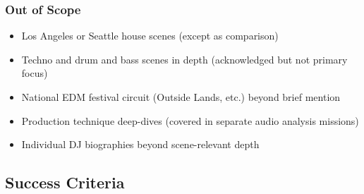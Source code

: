 \documentclass[11pt,letterpaper]{article}
\begin{document}
\subsubsection{Out of Scope}
\begin{itemize}[leftmargin=1.5em]
  \item Los Angeles or Seattle house scenes (except as comparison)
  \item Techno and drum and bass scenes in depth (acknowledged but not primary focus)
  \item National EDM festival circuit (Outside Lands, etc.) beyond brief mention
  \item Production technique deep-dives (covered in separate audio analysis missions)
  \item Individual DJ biographies beyond scene-relevant depth
\end{itemize}

\subsection{Success Criteria}
\end{document}
